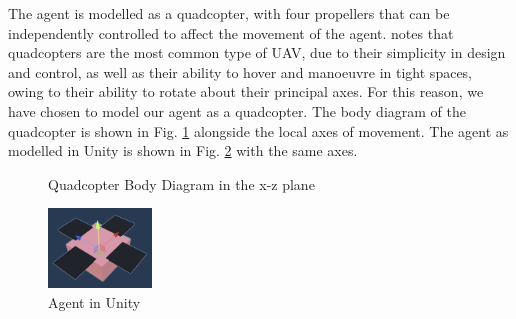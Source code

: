 \documentclass[12pt]{article}
\begin{document}
The agent is modelled as a quadcopter, with four propellers that can be independently controlled to affect the movement of the agent. \citet{Thamm} notes that quadcopters are the most common type of UAV, due to their simplicity in design and control, as well as their ability to hover and manoeuvre in tight spaces, owing to their ability to rotate about their principal axes. For this reason, we have chosen to model our agent as a quadcopter. The body diagram of the quadcopter is shown in Fig. \ref{fig:quadcopter} alongside the local axes of movement. The agent as modelled in Unity is shown in Fig. \ref{fig:quadcopter-unity} with the same axes.

\begin{figure}[ht]
    \centering
    \caption{Quadcopter Body Diagram in the x-z plane}
    \label{fig:quadcopter}
\end{figure}

\begin{figure}[ht]
    \centering
    \includegraphics[height=80px]{agent}
    \caption{Agent in Unity}
    \label{fig:quadcopter-unity}
\end{figure}
\end{document}
